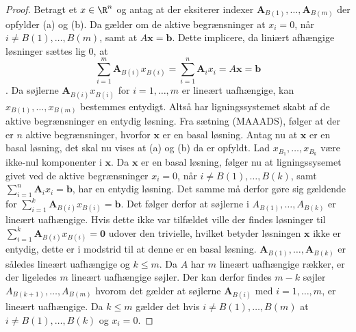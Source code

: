 \begin{proof}
Betragt et $x \in \R^n$ og antag at der eksiterer indexer $\mathbf{A}_{B(1)},\ldots,\mathbf{A}_{B(m)}$ der opfylder (a) og (b).
Da gælder om de aktive begrænsninger at $x_i=0$, når $i\neq B(1),\ldots,B(m)$, samt at $A\mathbf{x}=\mathbf{b}$.
Dette implicere, da liniært afhængige løsninger sættes lig $0$,  at 
$$\sum_{i=1}^{m}\textbf{A}_{B(i)}x_{B(i)}=\sum_{i=1}^{n}\textbf{A}_ix_i=A\textbf{x}=\textbf{b}$$.
Da søjlerne $\textbf{A}_{B(i)}x_{B(i)}$ for $i=1,\ldots,m$ er lineært uafhængige, kan $x_{B(1)},\ldots,x_{B(m)}$ bestemmes entydigt. 
Altså har ligningssystemet skabt af de aktive begrænsninger en entydig løsning.
Fra sætning (MAAADS), følger at der er $n$ aktive begrænsninger, hvorfor $\mathbf{x}$ er en basal løsning. 
Antag nu at $\mathbf{x}$ er en basal løsning, det skal nu vises at (a) og (b) da er opfyldt.
Lad $x_{B_1},\ldots,x_{B_k}$ være ikke-nul komponenter i $\textbf{x}$.
Da $\mathbf{x}$ er en basal løsning, følger nu at ligningssysemet givet ved de aktive begrænsninger $x_i=0$, når $i\neq B(1),\ldots,B(k)$, samt  $\sum_{i=1}^{n}\mathbf{A}_ix_i=\mathbf{b}$, har en entydig løsning. 
Det samme må derfor gøre sig gældende for $\sum_{i=1}^{k}\mathbf{A}_{B(i)}x_{B(i)}=\mathbf{b}$.
Det følger derfor at søjlerne i $A_{B(1)},\ldots,A_{B(k)}$ er lineært uafhængige.
Hvis dette ikke var tilfældet ville der findes løsninger til $\sum_{i=1}^{k}\mathbf{A}_{B(i)} x_{B(i)}=\mathbf{0}$ udover den trivielle, hvilket betyder løsningen $\mathbf{x}$ ikke er entydig, dette er i modstrid til at denne er en basal løsning.
$\mathbf{A}_{B(1)},\ldots ,\mathbf{A}_{B(k)}$ er således lineært uafhængige og $k \leq m$.
Da $A$ har $m$ lineært uafhængige rækker, er der ligeledes $m$ lineært uafhængige søjler.
Der kan derfor findes $m-k$ søjler $A_{B(k+1)},\ldots,A_{B(m)}$ hvorom det gælder at søjlerne $\mathbf{A}_{B(i)}$ med $i=1,\ldots,m$, er lineært uafhængige.
Da $k \leq m$ gælder det hvis $i \neq B(1),\ldots,B(m)$ at $i \neq B(1),\ldots,B(k)$ og $x_i=0$.
\end{proof}
